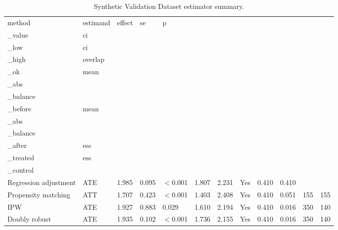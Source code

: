\begin{table}[t!]
\centering
\small
\caption{Synthetic Validation Dataset estimator summary.}
\label{tab:synthetic_validation_dataset-estimators}
\setlength{\tabcolsep}{4.5pt}
\begin{tabular}{llllllllllll}
\hline
method & estimand & effect & se & p\\_value & ci\\_low & ci\\_high & overlap\\_ok & mean\\_abs\\_balance\\_before & mean\\_abs\\_balance\\_after & ess\\_treated & ess\\_control \\
\hline
Regression adjustment & ATE & 1.985 & 0.095 & $<$0.001 & 1.807 & 2.231 & Yes & 0.410 & 0.410 &  &  \\
Propensity matching & ATT & 1.707 & 0.423 & $<$0.001 & 1.403 & 2.408 & Yes & 0.410 & 0.051 & 155 & 155 \\
IPW & ATE & 1.927 & 0.883 & 0.029 & 1.610 & 2.194 & Yes & 0.410 & 0.016 & 350 & 140 \\
Doubly robust & ATE & 1.935 & 0.102 & $<$0.001 & 1.736 & 2.155 & Yes & 0.410 & 0.016 & 350 & 140 \\
\hline
\end{tabular}
\end{table}
